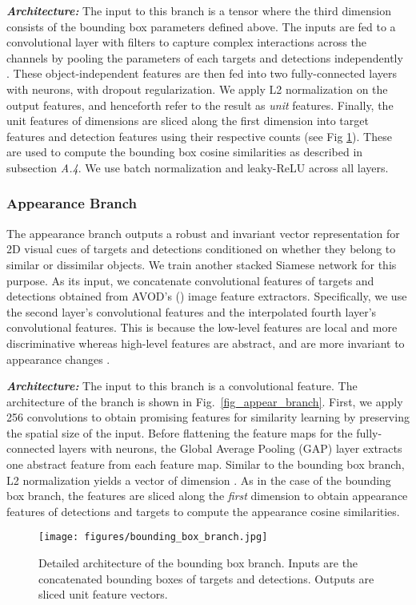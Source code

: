 \documentclass[letterpaper, 10 pt, conference]{ieeeconf}
\begin{document}
\textbf{\textit{Architecture:}} The input to this branch is a  tensor where the third dimension consists of the  bounding box parameters defined above. The inputs are fed to a convolutional layer with   filters to capture complex interactions across the  channels by pooling the parameters of each targets and detections independently \cite{Net_in_Net}. These object-independent features are then fed into two fully-connected layers with  neurons, with dropout regularization. We apply L2 normalization on the output features, and henceforth refer to the result as \textit{unit} features. Finally, the unit features of dimensions  are sliced along the first dimension into target features and detection features using their respective counts (see Fig \ref{fig_bbox_branch}). These are used to compute the bounding box cosine similarities as described in subsection \textit{A.4}. We use batch normalization and leaky-ReLU across all layers.

\subsubsection{Appearance Branch}
The appearance branch outputs a robust and invariant vector representation for 2D visual cues of targets and detections conditioned on whether they belong to similar or dissimilar objects. We train another stacked Siamese network for this purpose. As its input, we concatenate convolutional features of targets and detections obtained from AVOD's (\cite{AVOD}) image feature extractors. Specifically, we use the second layer's convolutional features and the interpolated fourth layer's convolutional features. This is because the low-level features are local and more discriminative whereas high-level features are abstract, and are more invariant to appearance changes \cite{CRBM, Visual_conv}.

 \textbf{\textit{Architecture:}} The input to this branch is a  convolutional feature. The architecture of the branch is shown in Fig.~\ref{fig_appear_branch}. First, we apply 256  convolutions to obtain promising features for similarity learning by preserving the spatial size of the input. Before flattening the feature maps for the fully-connected layers with  neurons, the Global Average Pooling (GAP) \cite{lin2013network} layer extracts one abstract feature from each feature map. Similar to the bounding box branch, L2 normalization yields a vector of dimension . As in the case of the bounding box branch, the  features are sliced along the \textit{first} dimension to obtain appearance features of detections and targets to compute the appearance cosine similarities.
\begin{figure}[t]
\begin{center}
\texttt{[image: figures/bounding\_box\_branch.jpg]}
\end{center}
\caption{Detailed architecture of the bounding box branch. Inputs are the concatenated bounding boxes of targets and detections. Outputs are sliced unit feature vectors.}
\label{fig_bbox_branch}
\end{figure}
\end{document}
